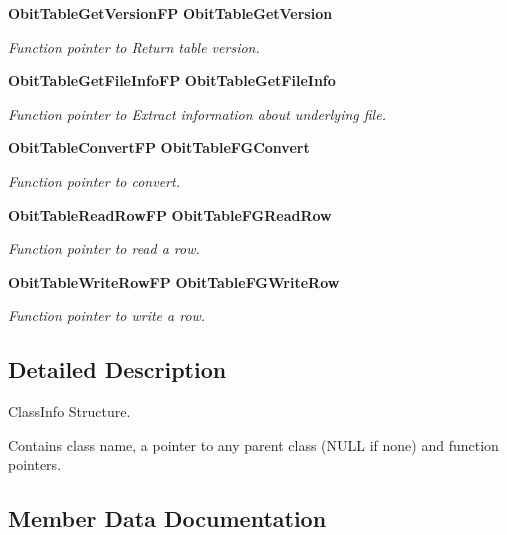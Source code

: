 \begin{CompactItemize}
{\bf Obit\-Table\-Get\-Version\-FP} {\bf Obit\-Table\-Get\-Version}
\begin{CompactList}\small\item\em Function pointer to Return table version. \item\end{CompactList}\item 
{\bf Obit\-Table\-Get\-File\-Info\-FP} {\bf Obit\-Table\-Get\-File\-Info}
\begin{CompactList}\small\item\em Function pointer to Extract information about underlying file. \item\end{CompactList}\item 
{\bf Obit\-Table\-Convert\-FP} {\bf Obit\-Table\-FGConvert}
\begin{CompactList}\small\item\em Function pointer to convert. \item\end{CompactList}\item 
{\bf Obit\-Table\-Read\-Row\-FP} {\bf Obit\-Table\-FGRead\-Row}
\begin{CompactList}\small\item\em Function pointer to read a row. \item\end{CompactList}\item 
{\bf Obit\-Table\-Write\-Row\-FP} {\bf Obit\-Table\-FGWrite\-Row}
\begin{CompactList}\small\item\em Function pointer to write a row. \item\end{CompactList}\end{CompactItemize}


\subsection{Detailed Description}
Class\-Info Structure. 

Contains class name, a pointer to any parent class (NULL if none) and function pointers. 



\subsection{Member Data Documentation}
